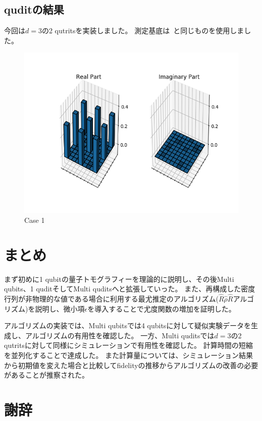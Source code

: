 \documentclass[11pt,a4j,notitlepage]{jreport}
\begin{document}
	\section{quditの結果}

	今回は$d=3$の2 qutritsを実装しました。
	測定基底は~\cite{qutrit}と同じものを使用しました。

	\begin{figure}[htbp]
		\centering
			\includegraphics[clip,width=12.0cm]{./picture/qutrit.png}
			\caption{Case 1}
	\end{figure}

	\chapter{まとめ}

	まず初めに1 qubitの量子トモグラフィーを理論的に説明し、その後Multi qubits、1 quditそしてMulti quditsへと拡張していった。
	また、再構成した密度行列が非物理的な値である場合に利用する最尤推定のアルゴリズム($\hat{R} \hat{\rho} \hat{R}$アルゴリズム)を説明し、微小項$\epsilon$を導入することで尤度関数の増加を証明した。

	アルゴリズムの実装では、Multi qubitsでは4 qubitsに対して疑似実験データを生成し、アルゴリズムの有用性を確認した。
	一方、Multi quditsでは$d=3$の2 qutritsに対して同様にシミュレーションで有用性を確認した。
	計算時間の短縮を並列化することで達成した。
	また計算量については、シミュレーション結果から初期値を変えた場合と比較してfidelityの推移からアルゴリズムの改善の必要があることが推察された。


	\chapter*{謝辞}
\end{document}
